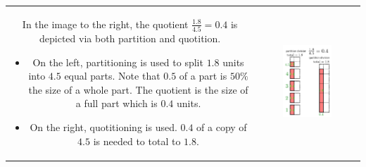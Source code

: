 \documentclass{article}
\begin{document}
\vspace{5mm}


\begin{tabular}{cc}
\parbox{0.4\textwidth}{
In the image to the right, the quotient \(\frac{1.8}{4.5} = 0.4\) is depicted via both partition and quotition. 
\begin{itemize}
\item On the left, partitioning is used to split \(1.8\) units into \(4.5\) equal parts. Note that \(0.5\) of a part is \(50\%\) the size of a whole part. The quotient is the size of a full part which is \(0.4\) units.
\item On the right, quotitioning is used. \(0.4\) of a copy of \(4.5\) is needed to total to \(1.8\). 
\end{itemize}
}
& \parbox{0.5\textwidth}{
\includegraphics[width = 0.5\textwidth]{1p8_div_4p5}
}
\end{tabular}

\vspace{5mm}

\end{document}
